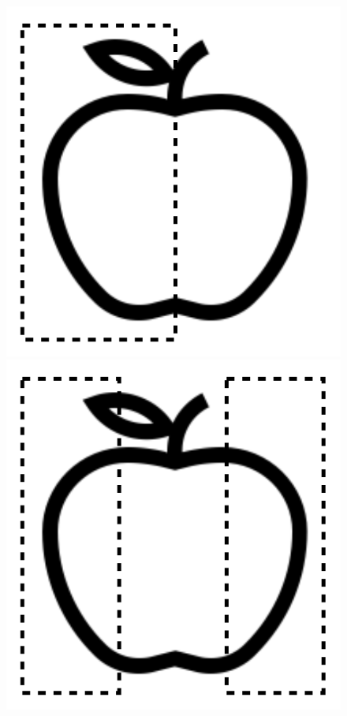 \begin{figure}
\begin{floatrow}
\captionsetup{margin=.05\linewidth}
        {\includegraphics[scale=0.5]{figures/apple_cont-half.png}}
        {\includegraphics[scale=0.5]{figures/apple_discont-half.png}}
\end{floatrow}
\end{figure}


